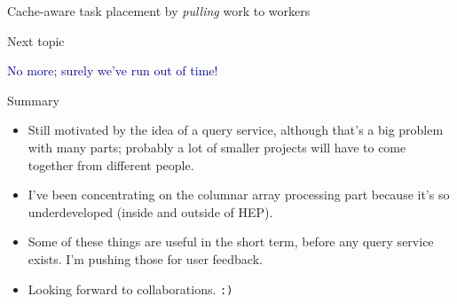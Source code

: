 \documentclass[aspectratio=169]{beamer}
\begin{document}
\begin{frame}{Cache-aware task placement by {\it pulling} work to workers}
\end{frame}

\begin{frame}{Next topic}
\Large
\vspace{1 cm}
\begin{center}
\textcolor{darkblue}{No more; surely we've run out of time!}
\end{center}
\end{frame}

\begin{frame}{Summary}
\large
\vspace{0.5 cm}
\begin{itemize}\setlength{\itemsep}{0.5 cm}
\item Still motivated by the idea of a query service, although that's a big problem with many parts; probably a lot of smaller projects will have to come together from different people.

\item I've been concentrating on the columnar array processing part because it's so underdeveloped (inside and outside of HEP).

\item Some of these things are useful in the short term, before any query service exists. I'm pushing those for user feedback.

\item Looking forward to collaborations.  {\tt\small :)}
\end{itemize}
\end{frame}
\end{document}
